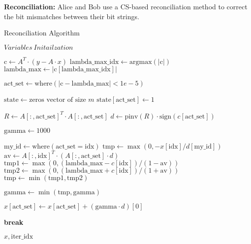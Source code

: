 \textbf{Reconciliation:} Alice and Bob use a CS-based reconciliation method to correct the bit mismatches between their bit strings.
\begin{algorithm}[hbt!]
  \caption{Reconciliation Algorithm}\label{alg:Reconciliation}
  \begin{algorithmic}
      \State $Variables\ Initailzation$
  
          \State $\text{c} \gets A^T \cdot (y - A \cdot x)$
          \State $\text{lambda\_max\_idx} \gets \text{argmax}(|\text{c}|)$
          \State $\text{lambda\_max} \gets |\text{c}[\text{lambda\_max\_idx}]|$
  
          \State $\text{act\_set} \gets \text{where}(|\text{c} - \text{lambda\_max}| < 1e-5)$
  
          \State $\text{state} \gets \text{zeros vector of size } m$
          \State $\text{state}[\text{act\_set}] \gets 1$
  
          \State $R \gets A[:, \text{act\_set}]^T \cdot A[:, \text{act\_set}]$
          \State $d \gets \text{pinv}(R) \cdot \text{sign}(c[\text{act\_set}])$
  
          \State $\text{gamma} \gets 1000$
  
                  \State $\text{my\_id} \gets \text{where}(\text{act\_set} = \text{idx})$
                  \State $\text{tmp} \gets \max(0, -x[\text{idx}] / d[\text{my\_id}])$
              \Else
                  \State $\text{av} \gets A[:, \text{idx}]^T \cdot (A[:, \text{act\_set}] \cdot d)$
                  \State $\text{tmp1} \gets \max(0, (\text{lambda\_max} - c[\text{idx}]) / (1 - \text{av}))$
                  \State $\text{tmp2} \gets \max(0, (\text{lambda\_max} + c[\text{idx}]) / (1 + \text{av}))$
                  \State $\text{tmp} \gets \min(\text{tmp1}, \text{tmp2})$
              \EndIf
  
                  \State $\text{gamma} \gets \min(\text{tmp}, \text{gamma})$
              \EndIf
          \EndFor
  
          \State $x[\text{act\_set}] \gets x[\text{act\_set}] + (\text{gamma} \cdot d)[0]$
  
              \State \textbf{break}
          \EndIf
      \EndFor
  
      \State \Return $x, \text{iter\_idx}$
  \EndFunction
  \end{algorithmic}
  \end{algorithm}
